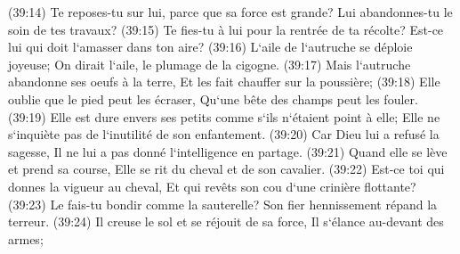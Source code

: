 \verse (39:14) Te reposes-tu sur lui, parce que sa force est grande? Lui abandonnes-tu le soin de tes travaux? 
\verse (39:15) Te fies-tu à lui pour la rentrée de ta récolte? Est-ce lui qui doit l`amasser dans ton aire? 
\verse (39:16) L`aile de l`autruche se déploie joyeuse; On dirait l`aile, le plumage de la cigogne. 
\verse (39:17) Mais l`autruche abandonne ses oeufs à la terre, Et les fait chauffer sur la poussière; 
\verse (39:18) Elle oublie que le pied peut les écraser, Qu`une bête des champs peut les fouler. 
\verse (39:19) Elle est dure envers ses petits comme s`ils n`étaient point à elle; Elle ne s`inquiète pas de l`inutilité de son enfantement. 
\verse (39:20) Car Dieu lui a refusé la sagesse, Il ne lui a pas donné l`intelligence en partage. 
\verse (39:21) Quand elle se lève et prend sa course, Elle se rit du cheval et de son cavalier. 
\verse (39:22) Est-ce toi qui donnes la vigueur au cheval, Et qui revêts son cou d`une crinière flottante? 
\verse (39:23) Le fais-tu bondir comme la sauterelle? Son fier hennissement répand la terreur. 
\verse (39:24) Il creuse le sol et se réjouit de sa force, Il s`élance au-devant des armes; 
